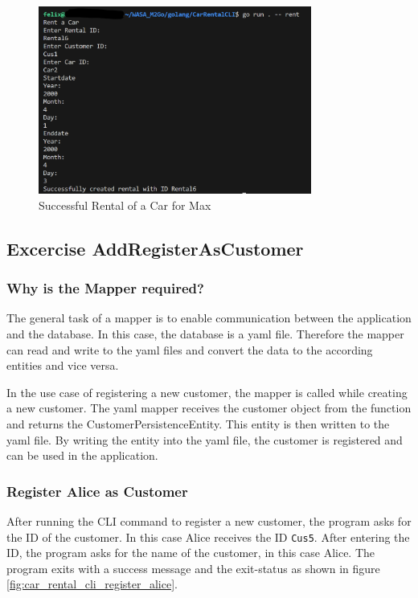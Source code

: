 \begin{figure}
      \centering
      \includegraphics[width=0.8\textwidth]{figures/goLang/carRental/carRentalCLI/carRentalCli_SuccessfulRentalMax.png}
      \caption{Successful Rental of a Car for Max}
      \label{fig:car_rental_cli_successful_rental_max}
\end{figure}

\subsection{Excercise AddRegisterAsCustomer}
\label{sec:exercise_add_register_as_customer}
\subsubsection*{Why is the Mapper required?}
The general task of a mapper is to enable communication between the application and the database.
In this case, the database is a yaml file.
Therefore the mapper can read and write to the yaml files and convert the data to the according entities and vice versa.

In the use case of registering a new customer, the mapper is called while creating a new customer.
The yaml mapper receives the customer object from the function and returns the CustomerPersistenceEntity.
This entity is then written to the yaml file.
By writing the entity into the yaml file, the customer is registered and can be used in the application.

\subsubsection*{Register Alice as Customer}
After running the CLI command to register a new customer, the program asks for the ID of the customer.
In this case Alice receives the ID \texttt{Cus5}.
After entering the ID, the program asks for the name of the customer, in this case Alice.
The program exits with a success message and the exit-status as shown in figure \ref{fig:car_rental_cli_register_alice}.

